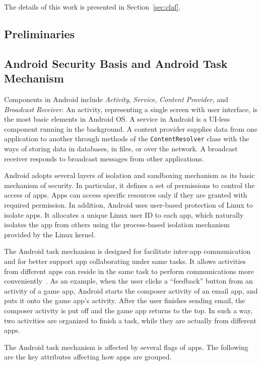 \documentclass[letterpaper,12pt]{article}
\begin{document}
The details of this work is presented in Section~\ref{sec:claf}. 

   \newpage
      \begin{singlespace}
           \section{Preliminaries}
      \end{singlespace}
   \label{sec:preliminaries}
\subsection{Android Security Basis and Android Task Mechanism}
Components in Android include {\em Activity}, {\em Service}, {\em
  Content Provider}, and {\em Broadcast Receiver}. An activity,
representing a single screen with user interface, is the most basic
elements in Android OS. A service in Android is a UI-less component
running in the background. A content provider supplies data from one
application to another through methods of the \texttt{ContentResolver}
class with the ways of storing data in databases, in files, or over
the network. A broadcast receiver responds to broadcast messages from
other applications.

Android adopts several layers of isolation and sandboxing mechanism as
its basic mechanism of security. In particular, it defines a set of
permissions to control the access of apps. Apps can access specific
resources only if they are granted with required permission.  In
addition, Android uses user-based protection of Linux to isolate
apps. It allocates a unique Linux user ID to each app, which naturally
isolates the app from others using the process-based isolation
mechanism provided by the Linux kernel.

The Android task mechanism is designed for facilitate inter-app
communication and for better support app collaborating under same
tasks. It allows activities from different apps can reside in the same
task to perform communications more conveniently~\cite{taskdoc}.  As
an example, when the user clicks a ``feedback'' button from an
activity of a game app, Android starts the composer activity of an
email app, and puts it onto the game app's activity.  After the user
finishes sending email, the composer activity is put off and the game
app returns to the top.  In such a way, two activities are organized
to finish a task, while they are actually from different apps.


The Android task mechanism is affected by several flags of apps. The
following are the key attributes affecting how apps are grouped.
\end{document}
